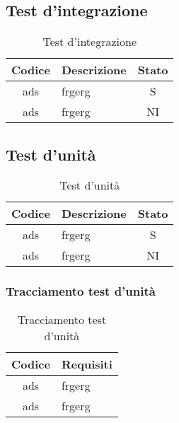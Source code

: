 \subsection{Test d'integrazione}\label{subsection:test_integrazione}
\begin{table}[H]
  \centering
  \renewcommand{\arraystretch}{1.8}
  \begin{tabular}{c|p{8cm}|c}
    \rowcolor[HTML]{125E28}
    \color[HTML]{FFFFFF}\textbf{Codice}
    & \multicolumn{1}{c}{\color[HTML]{FFFFFF}\textbf{Descrizione}}
    & \color[HTML]{FFFFFF}\textbf{Stato}\\
    \hline
    ads & frgerg & S \\
    ads & frgerg & NI \\
  \end{tabular}
  \caption{Test d'integrazione}
\end{table}

\subsection{Test d'unità}\label{subsection:test_unita}
\begin{table}[H]
  \centering
  \renewcommand{\arraystretch}{1.8}
  \begin{tabular}{c|p{8cm}|c}
    \rowcolor[HTML]{125E28}
    \color[HTML]{FFFFFF}\textbf{Codice}
    & \multicolumn{1}{c}{\color[HTML]{FFFFFF}\textbf{Descrizione}}
    & \color[HTML]{FFFFFF}\textbf{Stato}\\
    \hline
    ads & frgerg & S\\
    ads & frgerg & NI \\
  \end{tabular}
  \caption{Test d'unità}
\end{table}

\subsubsection{Tracciamento test d'unità}\label{subsubsection:tracciamento_test_unita}
\begin{table}[H]
  \centering
  \renewcommand{\arraystretch}{1.8}
  \begin{tabular}{c|l}
    \rowcolor[HTML]{125E28}
    \color[HTML]{FFFFFF}\textbf{Codice}
    & \multicolumn{1}{c}{\color[HTML]{FFFFFF}\textbf{Requisiti}}\\
    \hline
    ads & frgerg \\
    ads & frgerg \\
  \end{tabular}
  \caption{Tracciamento test d'unità}
\end{table}